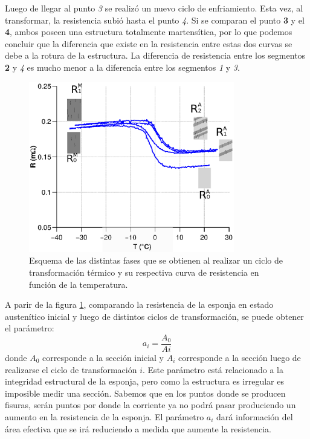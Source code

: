 \documentclass[a4paper,12pt,fleqn,twoside,openany]{book}
\begin{document}
 Luego de llegar al punto \textit{3} se realizó un nuevo ciclo de enfriamiento. Esta vez, al transformar, la resistencia subió hasta el punto \textit{4}. Si se comparan el punto \textbf{3} y el \textbf{4}, ambos poseen una estructura totalmente martensítica, por lo que podemos concluir que la diferencia que existe en la resistencia entre estas dos curvas se debe a la rotura de la estructura. La diferencia de resistencia entre los segmentos \textbf{2} y \textit{4} es mucho menor a la diferencia entre los segmentos \textit{1} y \textit{3}. 
%  
%  
 
 \begin{figure}[h]
 \centering
 \includegraphics[width=0.8\textwidth]{Img/Resultados/Resistencia/Histeresis2.eps}
 \caption{Esquema de las distintas fases que se obtienen al realizar un ciclo de transformación térmico y su respectiva curva de resistencia en función de la temperatura.} 
 \label{fig:HistEsquema}
 \end{figure}

 A parir de la figura \ref{fig:HistEsquema}, comparando la resistencia de la esponja en estado austenítico inicial y luego de distintos ciclos de transformación, se puede obtener el parámetro:
 \begin{equation}
  a_i = \frac{A_0}{Ai}
 \end{equation}
donde $A_0$ corresponde a la sección inicial y $A_i$ corresponde a la sección luego de realizarse el ciclo de transformación $i$. Este parámetro está relacionado a la integridad estructural de la esponja, pero como la estructura es irregular es imposible medir una sección. Sabemos que en los puntos donde se producen fisuras, serán puntos por donde la corriente ya no podrá pasar produciendo un aumento en la resistencia de la esponja. El parámetro $a_i$ dará información del área efectiva que se irá reduciendo a medida que aumente la resistencia. 
\end{document}

